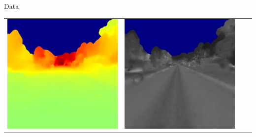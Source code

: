 \begin{frame}{Data}
\begin{tabular}{c c c c}
		\includegraphics[width=\widthcase]{images/dataset/depth_000052_mono_rear.jpg} &
		\includegraphics[width=\widthcase]{images/dataset/ref_000052_mono_rear.jpg} \\

\end{tabular}
\end{frame}
